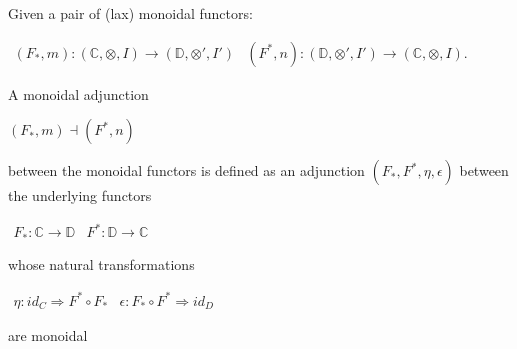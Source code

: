 \begin{definition}
\label{def:monoidal_adjunction}
    Given a pair of (lax) monoidal functors:
    \begin{center}
        \begin{math}
            \begin{array}{lr}
                (F_*,m) : (\mathbb{C}, \otimes, I) \rightarrow (\mathbb{D}, \otimes ' , I')
                &
                (F^*, n) : (\mathbb{D}, \otimes ', I') \rightarrow (\mathbb{C},\otimes,I).
            \end{array}
        \end{math}
    \end{center}
    A monoidal adjunction
    \begin{center}
        \begin{math}
            (F_*,m) \dashv (F^*, n)
        \end{math}
    \end{center}
    between the monoidal functors is defined as an adjunction $(F_*,F^*,\eta,\epsilon)$ between the underlying functors
    \begin{center}
        \begin{math}
            \begin{array}{lr}
                F_* : \mathbb{C} \rightarrow \mathbb{D}
                &
                F^* : \mathbb{D} \rightarrow \mathbb{C}
            \end{array}
        \end{math}
    \end{center}
    whose natural transformations 
    \begin{center}
        \begin{math}
            \begin{array}{lr}
                \eta : id_C \Rightarrow F^* \circ F_* & \epsilon : F_* \circ F^* \Rightarrow id_D
            \end{array}
        \end{math}
    \end{center}
    are monoidal \cite{mellies2009}
\end{definition}
